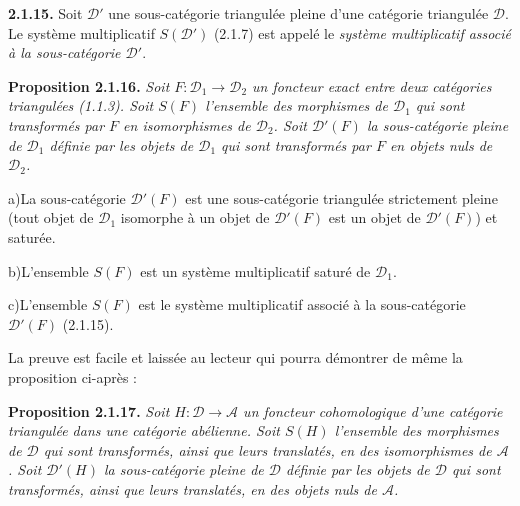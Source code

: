 \clearpage
{}%
\begingroup
\small
\setlength{\emergencystretch}{1.5em}%
\setlength{\abovedisplayskip}{1pt plus 1pt minus 1pt}%
\setlength{\belowdisplayskip}{1pt plus 1pt minus 1pt}%

\noindent\textbf{2.1.15.}\quad
{}%
Soit $\mathcal D'$ une sous-catégorie triangulée pleine d'une catégorie
triangulée $\mathcal D$. Le système multiplicatif $S(\mathcal D')$ (2.1.7)
est appelé le \emph{système multiplicatif associé à la sous-catégorie
$\mathcal D'$}.

\smallskip
\noindent\textbf{Proposition 2.1.16.}\quad
\begingroup\itshape
{}%
Soit $F\colon\mathcal D_1\to\mathcal D_2$ un foncteur exact entre deux
catégories triangulées (1.1.3). Soit $S(F)$ l'ensemble des morphismes de
$\mathcal D_1$ qui sont transformés par $F$ en isomorphismes de
$\mathcal D_2$.
%
Soit $\mathcal D'(F)$ la sous-catégorie pleine de $\mathcal D_1$ définie par
les objets de $\mathcal D_1$ qui sont transformés par $F$ en objets nuls de
$\mathcal D_2$.

\par\noindent\hspace*{2em}a)\enspace La sous-catégorie $\mathcal D'(F)$ est
une sous-catégorie triangulée strictement pleine (tout objet de
$\mathcal D_1$ isomorphe à un objet de $\mathcal D'(F)$ est un objet de
$\mathcal D'(F)$) et saturée.

\par\noindent\hspace*{2em}b)\enspace L'ensemble $S(F)$ est un système
multiplicatif saturé de $\mathcal D_1$.

\par\noindent\hspace*{2em}c)\enspace L'ensemble $S(F)$ est le système
multiplicatif associé à la sous-catégorie $\mathcal D'(F)$ (2.1.15).
\par\endgroup

\noindent La preuve est facile et laissée au lecteur qui pourra démontrer de
même la proposition ci-après :

\smallskip
\noindent\textbf{Proposition 2.1.17.}\quad
\begingroup\itshape
{}%
Soit $H\colon\mathcal D\to\mathcal A$ un foncteur cohomologique d'une
catégorie triangulée dans une catégorie abélienne. Soit $S(H)$ l'ensemble des
morphismes de $\mathcal D$ qui sont transformés, ainsi que leurs translatés,
en des isomorphismes de $\mathcal A$.
%
Soit $\mathcal D'(H)$ la sous-catégorie pleine de $\mathcal D$ définie par les
objets de $\mathcal D$ qui sont transformés, ainsi que leurs translatés, en
des objets nuls de $\mathcal A$.

